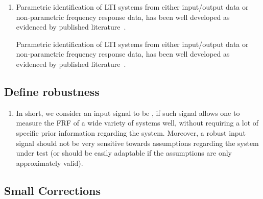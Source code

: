 \documentclass{responseletter}
\begin{document}
\begin{enumerate}
\item 
{}
\begin{oldquote}
Parametric identification of \gls{LTI} systems from either input/output data or non-parametric frequency response data, has been well developed as evidenced by published literature~\citep{Pintelon2012,Ljung1999,Schoukens1999,Pintelon1998}.
\end{oldquote}
\begin{newquote}
Parametric identification of \gls{LTI} systems from either input/output data or non-parametric frequency response data, has been well developed as evidenced by published literature~\citep{Pintelon2012,Ljung1999,Schoukens1999,Pintelon1998,Soderstrom1989,Goodwin1977,Brillinger1981,Sanathanan1963,McKelvey2002,Peeters2004}.
\end{newquote}
\end{enumerate}


\subsection{Define robustness}

\begin{enumerate}
  \item {}
  \begin{newquote}
  In short, we consider an input signal to be , if such signal allows one to measure the \gls{FRF} of a wide variety of systems well, without requiring a lot of specific prior information regarding the system.
Moreover, a robust input signal should not be very sensitive towards assumptions regarding the system under test (or should be easily adaptable if the assumptions are only approximately valid).
  \end{newquote}
\end{enumerate}

\subsection{Small Corrections}
\end{document}
